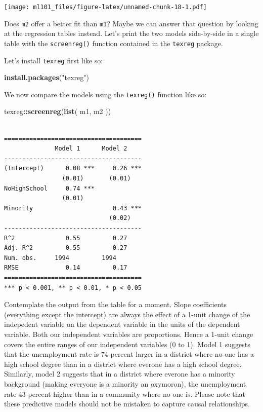 \documentclass[]{article}
\newenvironment{Shaded}{\begin{snugshade}}{\end{snugshade}}
\newcommand{\KeywordTok}[1]{\textcolor[rgb]{0.13,0.29,0.53}{\textbf{#1}}}
\newcommand{\NormalTok}[1]{#1}
\newcommand{\OperatorTok}[1]{\textcolor[rgb]{0.81,0.36,0.00}{\textbf{#1}}}
\newcommand{\StringTok}[1]{\textcolor[rgb]{0.31,0.60,0.02}{#1}}
\begin{document}
\texttt{[image: ml101\_files/figure-latex/unnamed-chunk-18-1.pdf]}

Does \texttt{m2} offer a better fit than \texttt{m1}? Maybe we can answer that question by looking at the regression tables instead. Let's print the two models side-by-side in a single table with the \texttt{screenreg()} function contained in the \texttt{texreg} package.

Let's install \texttt{texreg} first like so:

\begin{Shaded}
\begin{Highlighting}[]
\KeywordTok{install.packages}\NormalTok{(}\StringTok{"texreg"}\NormalTok{)}
\end{Highlighting}
\end{Shaded}

We now compare the models using the \texttt{texreg()} function like so:

\begin{Shaded}
\begin{Highlighting}[]
\NormalTok{texreg}\OperatorTok{::}\KeywordTok{screenreg}\NormalTok{(}\KeywordTok{list}\NormalTok{( m1, m2 ))}
\end{Highlighting}
\end{Shaded}

\begin{verbatim}

======================================
              Model 1      Model 2    
--------------------------------------
(Intercept)      0.08 ***     0.26 ***
                (0.01)       (0.01)   
NoHighSchool     0.74 ***             
                (0.01)                
Minority                      0.43 ***
                             (0.02)   
--------------------------------------
R^2              0.55         0.27    
Adj. R^2         0.55         0.27    
Num. obs.     1994         1994       
RMSE             0.14         0.17    
======================================
*** p < 0.001, ** p < 0.01, * p < 0.05
\end{verbatim}

Contemplate the output from the table for a moment. Slope coefficients (everything except the intercept) are always the effect of a 1-unit change of the indepedent variable on the dependent variable in the units of the dependent variable. Both our independent variables are proportions. Hence a 1-unit change covers the entire ranges of our independent variables (0 to 1). Model 1 suggests that the unemployment rate is 74 percent larger in a district where no one has a high school degree than in a district where everone has a high school degree. Similarly, model 2 suggests that in a district where everone has a minority background (making everyone is a minority an oxymoron), the unemployment rate 43 percent higher than in a community where no one is. Please note that these predictive models should not be mistaken to capture causal relationships.
\end{document}
